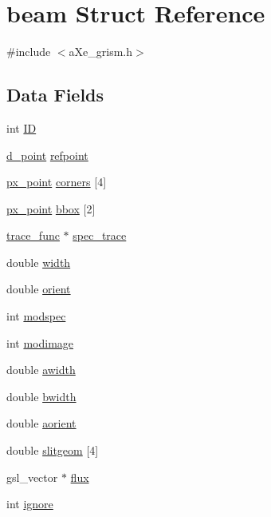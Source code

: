 \hypertarget{structbeam}{
\section{beam Struct Reference}
\label{structbeam}
}


{\ttfamily \#include $<$aXe\_\-grism.h$>$}\subsection*{Data Fields}
\begin{DoxyCompactItemize}
\item 
int \hyperlink{structbeam_a5c3f06b67e4cc3c79be539d1b515f3c6}{ID}
\item 
\hyperlink{structd__point}{d\_\-point} \hyperlink{structbeam_a54c64670a8b3e8732c1468d156ddb0ca}{refpoint}
\item 
\hyperlink{structpx__point}{px\_\-point} \hyperlink{structbeam_a785bab6bf808db6a8841654312d20899}{corners} \mbox{[}4\mbox{]}
\item 
\hyperlink{structpx__point}{px\_\-point} \hyperlink{structbeam_aa703d04290c347c35197ff52993b98f3}{bbox} \mbox{[}2\mbox{]}
\item 
\hyperlink{structtrace__func}{trace\_\-func} $\ast$ \hyperlink{structbeam_a918b8655ff4142f173ca73226ce27922}{spec\_\-trace}
\item 
double \hyperlink{structbeam_ae99ff960c070381b6e76af5a58cb9c45}{width}
\item 
double \hyperlink{structbeam_a362f20c7f29a9d08731a03939103c8c1}{orient}
\item 
int \hyperlink{structbeam_a60879dd4cb05dff92646b26f0b1ca8d8}{modspec}
\item 
int \hyperlink{structbeam_a343c47194d158bcc217a46923038e1a3}{modimage}
\item 
double \hyperlink{structbeam_a9a40c792769161a2526fb415c6dadad0}{awidth}
\item 
double \hyperlink{structbeam_acc52e3393f91f5f11a65d1a6806b681f}{bwidth}
\item 
double \hyperlink{structbeam_a5cbf4e447f3c6272f31215965e4d574c}{aorient}
\item 
double \hyperlink{structbeam_acc5dfdc4ba4457869ecb2a9395d1273e}{slitgeom} \mbox{[}4\mbox{]}
\item 
gsl\_\-vector $\ast$ \hyperlink{structbeam_a199b010e935235ef70f482416d113458}{flux}
\item 
int \hyperlink{structbeam_a8c7dc459dedfd957741d35c59440972f}{ignore}
\end{DoxyCompactItemize}


